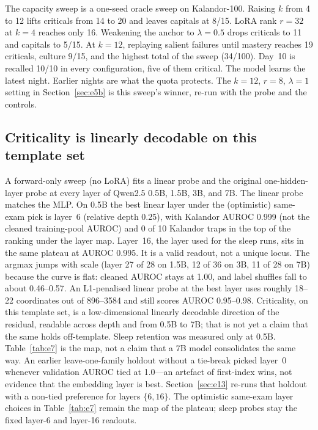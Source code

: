 \documentclass[11pt,a4paper]{article}
\begin{document}
The capacity sweep is a one-seed oracle sweep on Kalandor-100.
Raising $k$ from 4 to 12 lifts criticals from 14 to 20 and leaves capitals at 8/15.
LoRA rank $r{=}32$ at $k{=}4$ reaches only 16.
Weakening the anchor to $\lambda{=}0.5$ drops criticals to 11 and capitals to 5/15.
At $k{=}12$, replaying salient failures until mastery reaches 19 criticals, culture 9/15, and the highest total of the sweep (34/100).
Day~10 is recalled 10/10 in every configuration, five of them critical.
The model learns the latest night.
Earlier nights are what the quota protects.
The $k{=}12$, $r{=}8$, $\lambda{=}1$ setting in Section~\ref{sec:e5b} is this sweep's winner, re-run with the probe and the controls.

\subsection{Criticality is linearly decodable on this template set}
\label{sec:e7}

A forward-only sweep (no LoRA) fits a linear probe and the original one-hidden-layer probe at every layer of Qwen2.5 0.5B, 1.5B, 3B, and 7B.
The linear probe matches the MLP.
On 0.5B the best linear layer under the (optimistic) same-exam pick is layer~6 (relative depth 0.25), with Kalandor AUROC 0.999 (not the cleaned training-pool AUROC) and 0 of 10 Kalandor traps in the top of the ranking under the layer map.
Layer~16, the layer used for the sleep runs, sits in the same plateau at AUROC 0.995.
It is a valid readout, not a unique locus.
The argmax jumps with scale (layer 27 of 28 on 1.5B, 12 of 36 on 3B, 11 of 28 on 7B) because the curve is flat: cleaned AUROC stays at 1.00, and label shuffles fall to about 0.46--0.57.
An L1-penalised linear probe at the best layer uses roughly 18--22 coordinates out of 896--3584 and still scores AUROC 0.95--0.98.
Criticality, on this template set, is a low-dimensional linearly decodable direction of the residual, readable across depth and from 0.5B to 7B; that is not yet a claim that the same holds off-template.
Sleep retention was measured only at 0.5B.
Table~\ref{tab:e7} is the map, not a claim that a 7B model consolidates the same way.
An earlier leave-one-family holdout without a tie-break picked layer~0 whenever validation AUROC tied at 1.0---an artefact of first-index wins, not evidence that the embedding layer is best.
Section~\ref{sec:e13} re-runs that holdout with a non-tied preference for layers $\{6,16\}$.
The optimistic same-exam layer choices in Table~\ref{tab:e7} remain the map of the plateau; sleep probes stay the fixed layer-6 and layer-16 readouts.
\end{document}
